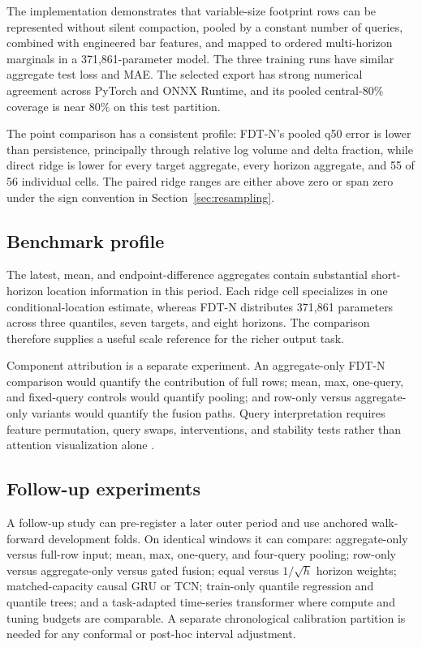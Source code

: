 \documentclass[10pt]{article}
\begin{document}
The implementation demonstrates that variable-size footprint rows can be represented without silent
compaction, pooled by a constant number of queries, combined with engineered bar features, and mapped to
ordered multi-horizon marginals in a 371,861-parameter model. The three training runs have similar
aggregate test loss and MAE. The selected export has strong numerical agreement across PyTorch and
ONNX Runtime, and its pooled central-80\% coverage is near 80\% on this test partition.

The point comparison has a consistent profile: FDT-N's pooled q50 error is lower than persistence,
principally through relative log volume and delta fraction, while direct ridge is lower for every
target aggregate, every horizon aggregate, and 55 of 56 individual cells. The paired ridge ranges are
either above zero or span zero under the sign convention in Section~\ref{sec:resampling}.

\subsection{Benchmark profile}

The latest, mean, and endpoint-difference aggregates contain substantial short-horizon location
information in this period. Each ridge cell specializes in one conditional-location estimate, whereas
FDT-N distributes 371,861 parameters across three quantiles, seven targets, and eight horizons. The
comparison therefore supplies a useful scale reference for the richer output task.

Component attribution is a separate experiment. An aggregate-only FDT-N comparison would quantify
the contribution of full rows; mean, max, one-query, and fixed-query controls would quantify pooling;
and row-only versus aggregate-only variants would quantify the fusion paths. Query interpretation
requires feature permutation, query swaps, interventions, and stability tests rather than attention
visualization alone \citep{jain2019attention}.

\subsection{Follow-up experiments}
\label{sec:follow-up}

A follow-up study can pre-register a later outer period and use anchored walk-forward development
folds. On identical windows it can compare: aggregate-only
versus full-row input; mean, max, one-query, and four-query pooling; row-only versus aggregate-only
versus gated fusion; equal versus $1/\sqrt h$ horizon weights; matched-capacity causal GRU or TCN;
train-only quantile regression and quantile trees; and a task-adapted time-series transformer where
compute and tuning budgets are comparable. A separate chronological calibration partition is needed
for any conformal or post-hoc interval adjustment.
\end{document}
